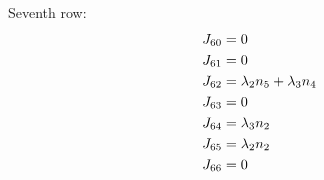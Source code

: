 \documentclass[a4paper, 12pt]{article}
\begin{document}
Seventh row:
\begin{equation*}
    \centering
    \begin{split}
        J_{60} &= 0\\
        J_{61} &= 0\\
        J_{62} &= \lambda_2n_5 + \lambda_3n_4\\
        J_{63} &= 0\\
        J_{64} &= \lambda_3n_2\\
        J_{65} &= \lambda_2n_2\\
        J_{66} &= 0
    \end{split}
\end{equation*}
\end{document}

